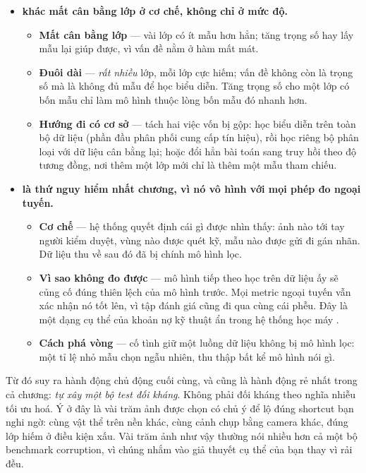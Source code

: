 \documentclass[../../deep_learning.tex]{subfiles}
\begin{document}
\begin{itemize}
\item \textbf{ khác mất cân bằng lớp ở cơ chế, không chỉ ở mức độ.}
  \begin{itemize}
  \item \textbf{Mất cân bằng lớp} --- vài lớp có ít mẫu hơn hẳn; tăng trọng số hay lấy mẫu lại giúp được, vì vấn đề nằm ở hàm mất mát.
  \item \textbf{Đuôi dài} --- \emph{rất nhiều} lớp, mỗi lớp cực hiếm; vấn đề không còn là trọng số mà là không đủ mẫu để học biểu diễn. Tăng trọng số cho một lớp có bốn mẫu chỉ làm mô hình thuộc lòng bốn mẫu đó nhanh hơn.
  \item \textbf{Hướng đi có cơ sở} --- tách hai việc vốn bị gộp: học biểu diễn trên toàn bộ dữ liệu (phần đầu phân phối cung cấp tín hiệu), rồi học riêng bộ phân loại với dữ liệu cân bằng lại; hoặc đổi hẳn bài toán sang truy hồi theo độ tương đồng, nơi thêm một lớp mới chỉ là thêm một mẫu tham chiếu.
  \end{itemize}
\item \textbf{ là thứ nguy hiểm nhất chương, vì nó vô hình với mọi phép đo ngoại tuyến.}
  \begin{itemize}
  \item \textbf{Cơ chế} --- hệ thống quyết định cái gì được nhìn thấy: ảnh nào tới tay người kiểm duyệt, vùng nào được quét kỹ, mẫu nào được gửi đi gán nhãn. Dữ liệu thu về sau đó đã bị chính mô hình lọc.
  \item \textbf{Vì sao không đo được} --- mô hình tiếp theo học trên dữ liệu ấy sẽ củng cố đúng thiên lệch của mô hình trước. Mọi metric ngoại tuyến vẫn xác nhận nó tốt lên, vì tập đánh giá cũng đi qua cùng cái phễu. Đây là một dạng cụ thể của khoản nợ kỹ thuật ẩn trong hệ thống học máy \cite{sculley2015hidden}.
  \item \textbf{Cách phá vòng} --- cố tình giữ một luồng dữ liệu không bị mô hình lọc: một tỉ lệ nhỏ mẫu chọn ngẫu nhiên, thu thập bất kể mô hình nói gì.
  \end{itemize}
\end{itemize}

Từ đó suy ra hành động chủ động cuối cùng, và cũng là hành động rẻ nhất trong cả chương: \emph{tự xây một bộ test đối kháng}. Không phải đối kháng theo nghĩa nhiễu tối ưu hoá. Ý ở đây là vài trăm ảnh được chọn có chủ ý để lộ đúng shortcut bạn nghi ngờ: cùng vật thể trên nền khác, cùng cảnh chụp bằng camera khác, đúng lớp hiếm ở điều kiện xấu. Vài trăm ảnh như vậy thường nói nhiều hơn cả một bộ benchmark corruption, vì chúng nhắm vào giả thuyết cụ thể của bạn thay vì rải đều.
\end{document}
